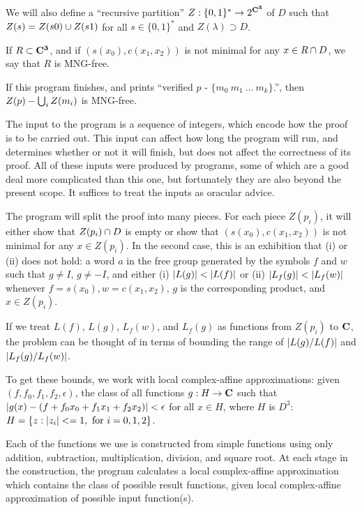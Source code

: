 We will also define a ``recursive partition''
$Z : \{0,1\}^* \rightarrow 2^{\bf C^3}$ of $D$ such that
$Z(s) = Z(s 0) \cup Z(s 1)$ for all $s \in \{0,1\}^*$
and $Z(\lambda) \supset D$.

If $R \subset \bf C^3$, and if $(s(x_0), c(x_1,x_2))$ is not minimal
for any $x \in R \cap D$, we say that $R$ is MNG-free.

\lemma
If this program finishes, and prints
``verified $p$ - $\{ m_0\ m_1\ \ldots\ m_k \}$.'',
then $Z(p) - \bigcup_i Z(m_i)$ is MNG-free.
\endlemma

The input to the program is a sequence of integers,
which encode how the proof is to be carried out.
This input can affect how long the program will run,
and determines whether or not it will finish,
but does not affect the correctness of its proof.
All of these inputs were produced by programs,
some of which are a good deal more complicated than this one,
but fortunately they are also beyond the present scope.
It suffices to treat the inputs as oracular advice.

\fi

The program will split the proof into many pieces.
For each piece $Z(p_i)$, it will either show
that $Z(p_i) \cap D$ is empty or show that
$(s(x_0),c(x_1,x_2))$ is not minimal for any $x \in Z(p_i)$.
In the second case, this is an exhibition that (i) or (ii) does not hold:
a word $a$ in the free group generated by the symbols $f$ and $w$
such that
$g \ne I$, $g \ne -I$,
and either
(i) $|{L(g)}| < |{L(f)}|$
or
(ii) $|{L_f(g)}| < |{L_f(w)}|$
whenever
$f = s(x_0), w = c(x_1, x_2)$,
$g$ is the corresponding product,
and $x \in Z(p_i)$.

If we treat $L(f)$, $L(g)$, $L_f(w)$, and $L_f(g)$
as functions from $Z(p_i)$ to $\bf C$,
the problem can be thought of in terms of bounding the range
of $|{L(g)/L(f)}|$ and $|{L_f(g)/L_f(w)}|$.

To get these bounds, we work with local complex-affine approximations:
given $(f,f_0,f_1,f_2, \epsilon)$,
the class of all functions $g : H \rightarrow \bf C$
such that $|{g(x) - (f + f_0 x_0 + f_1 x_1 + f_2 x_2)}| < \epsilon$
for all $x \in H$,
where $H$ is $D^3$:
$H = \{z : |{z_i}| <= 1, \hbox{ for } i=0,1,2\}$.

Each of the functions we use is constructed from simple functions
using only addition, subtraction, multiplication, division, and square root.
At each stage in the construction,
the program calculates a local complex-affine approximation which
contains the class of possible result functions, given
local complex-affine approximation of possible input function(s).

